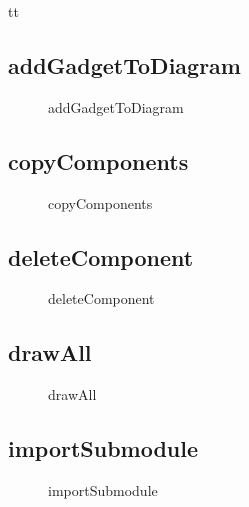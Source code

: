 \documentclass[12pt]{article}
\begin{document}
    tt

    \subsection{addGadgetToDiagram}
    \begin{figure}[H]
        \centering
        
        \caption{addGadgetToDiagram}
    \end{figure}

    \subsection{copyComponents}
    \begin{figure}[H]
        \centering
        
        \caption{copyComponents}
    \end{figure}

    \subsection{deleteComponent}
    \begin{figure}[H]
        \centering
        
        \caption{deleteComponent}
    \end{figure}

    \subsection{drawAll}
    \begin{figure}[H]
        \centering
        
        \caption{drawAll}
    \end{figure}


    \subsection{importSubmodule}
    \begin{figure}[H]
        \centering
        
        \caption{importSubmodule}
    \end{figure}

\end{document}
